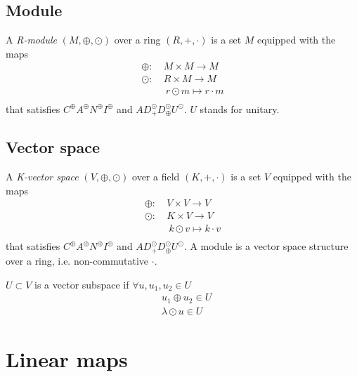 \documentclass[root.tex]{subfiles}
\begin{document}
\section{Module}
\begin{mydef}
  A \emph{R-module} $(M, \oplus, \odot )$ over a ring $(R, +, \cdot)$ is a set $M$ equipped with the maps
  \begin{align*}
    \oplus      :\ &M \times M \rightarrow M\\
    \odot       :\ &R \times M \rightarrow M\\
                &\ r \odot m \mapsto r\cdot m\\
  \end{align*}
  that satisfies $C^{\oplus}A^{\oplus}N^{\oplus}I^{\oplus}$ and $AD^{\odot}_+D^\odot_{\oplus}U^{\odot}$. $U$ stands for unitary.
\end{mydef}
\section{Vector space}
\begin{mydef}
  A \emph{K-vector space} $(V, \oplus, \odot )$ over a field $(K,+,\cdot)$ is a set $V$ equipped with the maps
  \begin{align*}
    \oplus  :\ &V \times V \rightarrow V\\
    \odot   :\ &K \times V \rightarrow V\\
            &\ k \odot v \mapsto k\cdot v\\
  \end{align*}
  that satisfies $C^{\oplus}A^{\oplus}N^{\oplus}I^{\oplus}$ and $AD^{\odot}_+D^\odot_{\oplus}U^{\odot}$. A module is a vector space structure over a ring, i.e. non-commutative $\cdot$.
\end{mydef}
\begin{mydef}
  $U \subset V$ is a vector subspace if $\forall u, u_1, u_2 \in U$  
  \begin{align*}
    &u_1 \oplus u_2 \in U\\
    &\lambda \odot u \in U
  \end{align*}
\end{mydef}


\chapter{Linear maps}%
\end{document}
